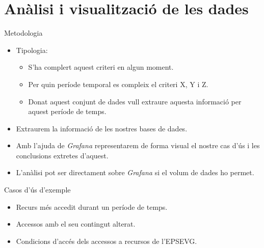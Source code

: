 \section{Anàlisi i visualització de les dades}\label{sec:data-analysis}

\begin{frame}{Metodologia}
    \begin{itemize}
        \item Tipologia:
        \begin{itemize}
            \item S’ha complert aquest criteri en algun moment.
            \item Per quin període temporal es compleix el criteri X, Y i Z.
            \item Donat aquest conjunt de dades vull extraure aquesta informació per aquest període de temps.
        \end{itemize}
        \item Extraurem la informació de les nostres bases de dades.
        \item Amb l’ajuda de \textit{Grafana} representarem de forma visual el nostre cas d’ús i les conclusions extretes d’aquest.
        \item L'anàlisi pot ser directament sobre \textit{Grafana} si el volum de dades ho permet.
    \end{itemize}
\end{frame}

\begin{frame}{Casos d'ús d'exemple}
    \begin{itemize}
        \item Recurs més accedit durant un període de temps.
        \item Accessos amb el seu contingut alterat.
        \item Condicions d'accés dels accessos a recursos de l'EPSEVG.
    \end{itemize}
\end{frame}

